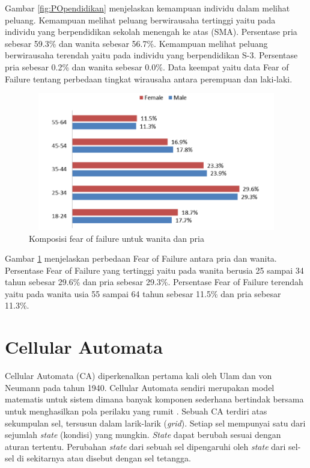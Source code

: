 Gambar \ref{fig:POpendidikan} menjelaskan kemampuan individu dalam melihat peluang. Kemampuan melihat peluang berwirausaha tertinggi yaitu pada individu yang berpendidikan sekolah menengah ke atas (SMA). Persentase pria sebesar 59.3\% dan wanita sebesar 56.7\%. Kemampuan melihat peluang berwirausaha terendah yaitu pada individu yang berpendidikan S-3. Persentase pria sebesar 0.2\% dan wanita sebesar 0.0\%. Data keempat yaitu data Fear of Failure tentang perbedaan tingkat wirausaha antara perempuan dan laki-laki.

\begin{figure} [H]
	\centering  
	\includegraphics[width=13cm, height=6cm]{FOFfemalemale} 
	\caption[Komposisi fear of failure untuk wanita dan pria]{Komposisi fear of failure untuk wanita dan pria} 
	\label{fig:FOF} 
\end{figure}  

Gambar \ref{fig:FOF} menjelaskan perbedaan Fear of Failure antara pria dan wanita. Persentase Fear of Failure yang tertinggi yaitu pada wanita berusia 25 sampai 34 tahun sebesar 29.6\% dan pria sebesar 29.3\%. Persentase Fear of Failure terendah yaitu pada wanita usia 55 sampai 64 tahun sebesar 11.5\% dan pria sebesar 11.3\%. 

\section{Cellular Automata}
\label{sec:cellularautomata}

Cellular Automata (CA) diperkenalkan pertama kali oleh Ulam dan von Neumann pada tahun 1940. Cellular Automata sendiri merupakan model matematis untuk sistem dimana banyak komponen sederhana bertindak bersama untuk menghasilkan pola perilaku yang rumit \cite{referensiCA2}. Sebuah CA terdiri atas sekumpulan sel, tersusun dalam larik-larik (\textit{grid}). Setiap sel mempunyai satu dari sejumlah \textit{state} (kondisi) yang mungkin. \textit{State} dapat berubah sesuai dengan aturan tertentu. Perubahan \textit{state} dari sebuah sel dipengaruhi oleh \textit{state} dari sel-sel di sekitarnya atau disebut dengan sel tetangga.

